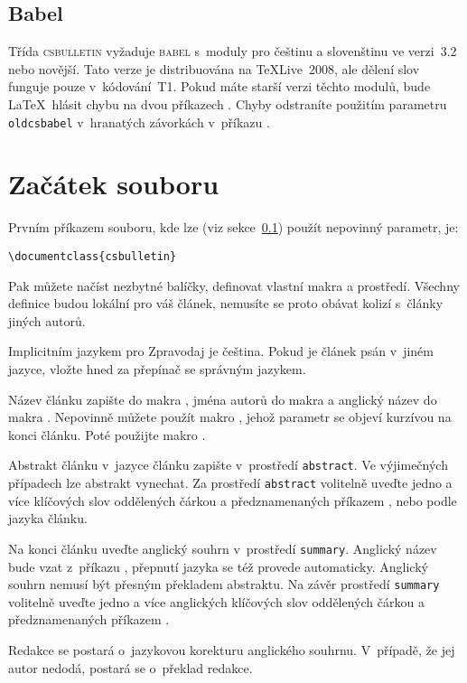 \documentclass{csbulletin}
\let\pkg\textsc
\begin{document}
\subsection{Babel}\label{babel}
Třída \pkg{csbulletin} vyžaduje \pkg{babel} s~moduly pro češtinu a slovenštinu ve verzi~3.2 nebo
novější. Tato verze je distribuována na \TeX Live~2008, ale dělení slov funguje pouze
v~kódování~T1. Pokud máte starší verzi těchto modulů, bude \LaTeX\ hlásit chybu na dvou příkazech
. Chyby odstraníte použitím parametru \texttt{oldcsbabel} v~hranatých
závorkách v~příkazu .

\section{Začátek souboru}
Prvním příkazem souboru, kde lze (viz sekce~\ref{babel}) použít nepovinný parametr, je:

\medskip
\verb;\documentclass{csbulletin};
\medskip

Pak můžete načíst nezbytné balíčky, definovat vlastní makra a prostředí. Všechny definice budou
lokální pro váš článek, nemusíte se proto obávat kolizí s~články jiných autorů.

Implicitním jazykem pro Zpravodaj je čeština. Pokud je článek psán v~jiném jazyce, vložte hned za
 přepínač  se správným jazykem.

Název článku zapište do makra , jména autorů do makra  a anglický název do
makra . Nepovinně můžete použít makro , jehož parametr se objeví
kurzívou na konci článku. Poté použijte makro .

Abstrakt článku v~jazyce článku zapište v~prostředí \texttt{abstract}. Ve výjimečných případech lze
abstrakt vynechat. Za prostředí \texttt{abstract} volitelně uveďte jedno a více klíčových slov
oddělených čárkou a předznamenaných příkazem ,  nebo
 podle jazyka článku.

Na konci článku uveďte anglický souhrn v~prostředí \texttt{summary}. Anglický název bude vzat
z~příkazu , přepnutí jazyka se též provede automaticky. Anglický souhrn nemusí být
přesným překladem abstraktu. Na závěr prostředí \texttt{summary} volitelně uveďte jedno a více
anglických klíčových slov oddělených čárkou a předznamenaných příkazem .

Redakce se postará o~jazykovou korekturu anglického souhrnu. V~případě, že jej autor nedodá,
postará se o~překlad redakce.
\end{document}
